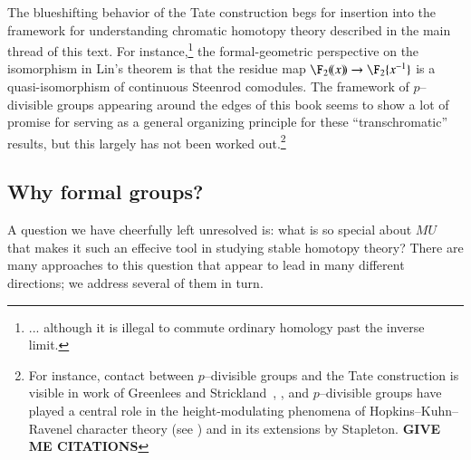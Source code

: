 The blueshifting behavior of the Tate construction begs for insertion into the framework for understanding chromatic homotopy theory described in the main thread of this text.  For instance,\footnote{... although it is illegal to commute ordinary homology past the inverse limit.} the formal-geometric perspective on the isomorphism in Lin's theorem is that the residue map $\F_2(\!(x)\!) \to \F_2\{x^{-1}\}$ is a quasi-isomorphism of continuous Steenrod comodules.  The framework of $p$--divisible groups appearing around the edges of this book seems to show a lot of promise for serving as a general organizing principle for these ``transchromatic'' results, but this largely has not been worked out.\footnote{For instance, contact between $p$--divisible groups and the Tate construction is visible in work of Greenlees and Strickland~\cite{GreenleesStrickland}, \cite[pg.\ 10]{StricklandFPFP}, and $p$--divisible groups have played a central role in the height-modulating phenomena of Hopkins--Kuhn--Ravenel character theory (see ) and in its extensions by Stapleton. \textbf{GIVE ME CITATIONS}}






\subsection*{Why formal groups?}

A question we have cheerfully left unresolved is: what is so special about $MU$ that makes it such an effecive tool in studying stable homotopy theory?  There are many approaches to this question that appear to lead in many different directions; we address several of them in turn.

